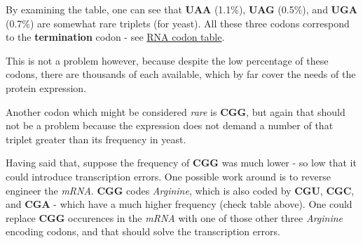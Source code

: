 
By examining the table, one can see that \textbf{UAA} (1.1\%), \textbf{UAG} (0.5\%), and \textbf{UGA} (0.7\%) are somewhat rare triplets (for yeast). All these three codons correspond to the \textbf{termination} codon - see \href{https://en.wikipedia.org/wiki/Genetic_code#RNA_codon_table}{RNA codon table}.

This is not a problem however, because despite the low percentage of these codons, there are thousands of each available, which by far cover the needs of the protein expression.

Another codon which might be considered \textit{rare} is \textbf{CGG}, but again that should not be a problem because the expression does not demand a number of that triplet greater than its frequency in yeast.

Having said that, suppose the frequency of \textbf{CGG} was much lower - so low that it could introduce transcription errors. One possible work around is to reverse engineer the \textit{mRNA}. \textbf{CGG} codes \textit{Arginine}, which is also coded by \textbf{CGU}, \textbf{CGC}, and \textbf{CGA} - which have a much higher frequency (check table above). One could replace \textbf{CGG} occurences in the \textit{mRNA} with one of those other three \textit{Arginine} encoding codons, and that should solve the transcription errors.

\newpage
